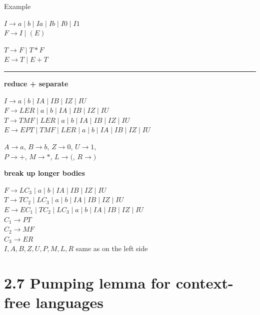 \documentclass[handout]{beamer}
\begin{document}
\begin{frame}{Example}

	\begin{multicols}{2}
		
		$I\rightarrow a\mid b\mid Ia\mid Ib\mid I0\mid I1$\\
		$F\rightarrow I\mid (E)$
		
		$T\rightarrow F\mid T*F$\\
		$E\rightarrow T\mid E+T$
	\end{multicols}

	\bigskip
	\hrule

	\begin{multicols}{2}
		\small

		\textbf{reduce + separate}

		$I\rightarrow a\mid b\mid IA\mid IB\mid IZ\mid IU$\\
		$F\rightarrow LER\mid a\mid b\mid IA\mid IB\mid IZ\mid IU$\\
		$T\rightarrow TMF\mid LER\mid a\mid b\mid IA\mid IB\mid IZ\mid IU$\\
		$E\rightarrow EPT\mid TMF\mid LER\mid a\mid b\mid IA\mid IB\mid IZ\mid IU$\\

		\bigskip
		
		$A\rightarrow a$, $B\rightarrow b$, $Z\rightarrow 0$, $U\rightarrow 1$,\\
		$P\rightarrow +$, $M\rightarrow *$, $L\rightarrow ($, $R\rightarrow )$
		
		\bigskip\bigskip

		\textbf{break up longer bodies}

		$F\rightarrow LC_3\mid a\mid b\mid IA\mid IB\mid IZ\mid IU$\\
		$T\rightarrow TC_2\mid LC_3\mid a\mid b\mid IA\mid IB\mid IZ\mid IU$\\
		$E\rightarrow EC_1\mid TC_2\mid LC_3\mid a\mid b\mid IA\mid IB\mid IZ\mid IU$\\
		$C_1\rightarrow PT$\\
		$C_2\rightarrow MF$\\
		$C_3\rightarrow ER$\\
		$I,A,B,Z,U,P,M,L,R$ same as on the left side
	\end{multicols}

\end{frame}


\section{2.7 Pumping lemma for context-free languages}
\end{document}
